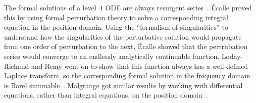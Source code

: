 \documentclass{article}
\theoremstyle{definition}
\theoremstyle{plain}
\begin{document}
The formal solutions of a level~$1$ ODE are always resurgent series~\cite[Proposition~2.2.1]{EcalleIII}. \'{E}calle proved this by using formal perturbation theory to solve a corresponding integral equation in the position domain. Using the ``formalism of singularities'' to understand how the singularities of the perturbative solution would propagate from one order of perturbation to the next, \'{E}calle showed that the pertrubation series would converge to an endlessly analytically continuable function. Loday-Richaud and Remy went on to show that this function always has a well-defined Laplace transform, so the corresponding formal solution in the frequency domain is Borel summable~\cite{loday-Remy2011}. Malgrange got similar results by working with differential equations, rather than integral equations, on the position domain~\cite{malgrange--fourier}.





\end{document}
